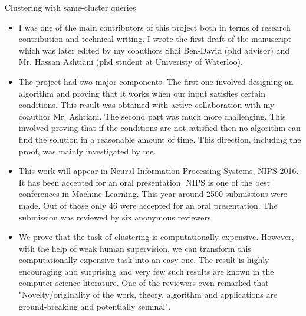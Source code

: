 \documentclass[12pt]{article}
\begin{document}
\noindent Clustering with same-cluster queries
\begin{itemize}[nolistsep]
\item I was one of the main contributors of this project both in terms of research contribution and technical writing. I wrote the first draft of the manuscript which was later edited by my coauthors Shai Ben-David (phd advisor) and Mr. Hassan Ashtiani (phd student at Univeristy of Waterloo). 
\item The project had two major components. The first one involved designing an algorithm and proving that it works when our input satisfies certain conditions. This result was obtained with active collaboration with my coauthor Mr. Ashtiani. The second part was much more challenging. This involved proving that if the conditions are not satisfied then no algorithm can find the solution in a reasonable amount of time. This direction, including the proof, was mainly investigated by me.
\item This work will appear in Neural Information Processing Systems, NIPS 2016. It has been accepted for an oral presentation. NIPS is one of the best conferences in Machine Learning. This year around 2500 submissions were made. Out of those only 46 were accepted for an oral presentation. The submission was reviewed by six anonymous reviewers.
\item We prove that the task of clustering is computationally expensive. However, with the help of weak human supervision, we can transform this computationally expensive task into an easy one. The result is highly encouraging and surprising and very few such results are known in the computer science literature. One of the reviewers even remarked that "Novelty/originality of the work, theory, algorithm and applications are ground-breaking and potentially seminal". 
\end{itemize}
\end{document}
